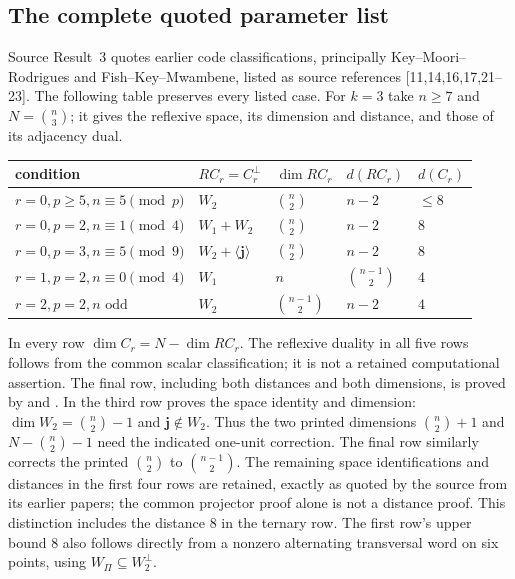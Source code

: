 \subsection{The complete quoted parameter list}
Source Result~3 quotes earlier code classifications, principally
Key--Moori--Rodrigues and Fish--Key--Mwambene, listed as source references
[11,14,16,17,21--23]. The following table preserves every listed case.
For $k=3$ take $n\geq7$ and $N=\binom n3$; it gives the reflexive space,
its dimension and distance, and those of its adjacency dual.
\begin{center}\small
\begin{tabular}{lllll}\toprule
condition&$RC_r=C_r^\perp$&$\dim RC_r$&$d(RC_r)$&$d(C_r)$\\\midrule
$r=0,p\geq5,n\equiv5\pmod p$&$W_2$&$\binom n2$&$n-2$&$\leq8$\\
$r=0,p=2,n\equiv1\pmod4$&$W_1+W_2$&$\binom n2$&$n-2$&$8$\\
$r=0,p=3,n\equiv5\pmod9$&$W_2+\langle\mathbf j\rangle$&$\binom n2$&$n-2$&$8$\\
$r=1,p=2,n\equiv0\pmod4$&$W_1$&$n$&$\binom{n-1}2$&$4$\\
$r=2,p=2,n\text{ odd}$&$W_2$&$\binom{n-1}2$&$n-2$&$4$\\\bottomrule
\end{tabular}
\end{center}
In every row $\dim C_r=N-\dim RC_r$.
The reflexive duality in all five rows follows from the common scalar
classification; it is not a retained computational assertion.
The final row, including both distances and both dimensions, is proved
by  and .
In the third row  proves the space identity and
dimension: $\dim W_2=\binom n2-1$ and $\mathbf j\notin W_2$.
Thus the two printed dimensions $\binom n2+1$ and
$N-\binom n2-1$ need the indicated one-unit correction.
The final row similarly corrects the printed $\binom n2$ to
$\binom{n-1}2$.
The remaining space identifications and distances in the first four
rows are retained, exactly as quoted by the source from its earlier
papers; the common projector proof alone is not a distance proof.
This distinction includes the distance $8$ in the ternary row.
The first row's upper bound $8$ also follows directly from a nonzero
alternating transversal word on six points, using $W_\Pi\subseteq W_2^\perp$.

